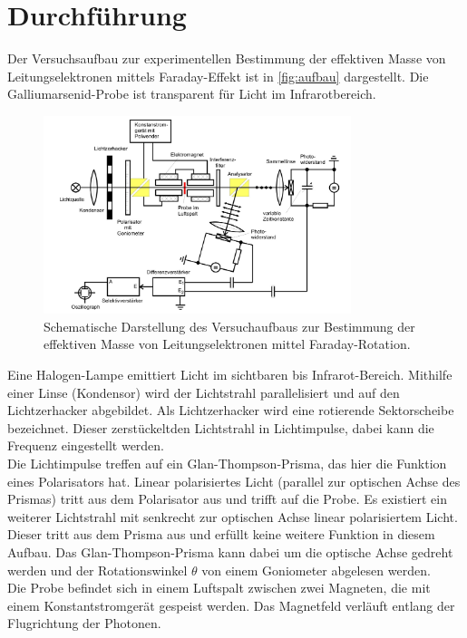 \section{Durchführung}
Der Versuchsaufbau zur experimentellen Bestimmung der effektiven Masse von Leitungselektronen mittels Faraday-Effekt ist in \autoref{fig:aufbau} dargestellt.
Die Galliumarsenid-Probe ist transparent für Licht im Infrarotbereich.
\begin{figure}
    \centering
    \includegraphics[width=0.8\textwidth]{figure/aufbau.jpg}
    \caption{Schematische Darstellung des Versuchaufbaus zur Bestimmung der effektiven Masse von Leitungselektronen mittel Faraday-Rotation. \cite{anleitung}}
    \label{fig:aufbau}
\end{figure}
Eine Halogen-Lampe emittiert Licht im sichtbaren bis Infrarot-Bereich.
Mithilfe einer Linse (Kondensor) wird der Lichtstrahl parallelisiert und auf den Lichtzerhacker abgebildet.
Als Lichtzerhacker wird eine rotierende Sektorscheibe bezeichnet.
Dieser \glqq zerstückelt\grqq den Lichtstrahl in Lichtimpulse, dabei kann die Frequenz eingestellt werden.
\\
Die Lichtimpulse treffen auf ein Glan-Thompson-Prisma, das hier die Funktion eines Polarisators hat.
Linear polarisiertes Licht (parallel zur optischen Achse des Prismas) tritt aus dem Polarisator aus und trifft auf die Probe.
Es existiert ein weiterer Lichtstrahl mit senkrecht zur optischen Achse linear polarisiertem Licht.
Dieser tritt aus dem Prisma aus und erfüllt keine weitere Funktion in diesem Aufbau.
Das Glan-Thompson-Prisma kann dabei um die optische Achse gedreht werden und der Rotationswinkel $\theta$ von einem Goniometer abgelesen werden.
\\
Die Probe befindet sich in einem Luftspalt zwischen zwei Magneten, die mit einem Konstantstromgerät gespeist werden.
Das Magnetfeld verläuft entlang der Flugrichtung der Photonen.
